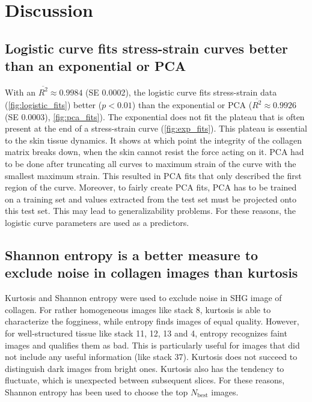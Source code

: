 \section{Discussion}

\subsection{Logistic curve fits stress-strain curves better than an exponential or PCA}
With an $\overline{R^2} \approx \num{0.9984}$ (SE \num{0.0002}), the logistic curve fits stress-strain data (\cref{fig:logistic_fits}) better ($p < 0.01$) than the exponential or PCA ($\overline{R^2} \approx \num{0.9926}$ (SE \num{0.0003}), \cref{fig:pca_fits}).
The exponential does not fit the plateau that is often present at the end of a stress-strain curve (\cref{fig:exp_fits}).
This plateau is essential to the skin tissue dynamics.
It shows at which point the integrity of the collagen matrix breaks down, \ie when the skin cannot resist the force acting on it.
PCA had to be done after truncating all curves to maximum strain of the curve with the smallest maximum strain.
This resulted in PCA fits that only described the first region of the curve.
Moreover, to fairly create PCA fits, PCA has to be trained on a training set and values extracted from the test set must be projected onto this test set.
This may lead to generalizability problems.
For these reasons, the logistic curve parameters are used as a predictors.

\subsection{Shannon entropy is a better measure to exclude noise in collagen images than kurtosis}\label{sec:disc_ent_vs_kur}
Kurtosis and Shannon entropy were used to exclude noise in SHG image of collagen.
For rather homogeneous images like stack 8, kurtosis is able to characterize the fogginess, while entropy finds images of equal quality.
However, for well-structured tissue like stack 11, 12, 13 and 4, entropy recognizes faint images and qualifies them as bad.
This is particularly useful for images that did not include any useful information (like stack 37).
Kurtosis does not succeed to distinguish dark images from bright ones.
Kurtosis also has the tendency to fluctuate, which is unexpected between subsequent slices.
For these reasons, Shannon entropy has been used to choose the top $N_\mathrm{best}$ images.


